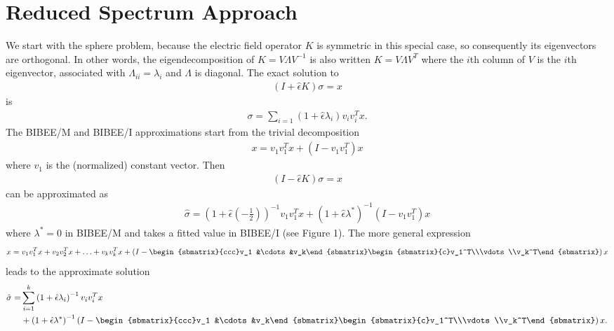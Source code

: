 \section{Reduced Spectrum Approach}
We start with the sphere problem, because the electric field operator
$K$ is symmetric in this special case, so consequently its
eigenvectors are orthogonal.  In other words, the eigendecomposition
of $K = V \Lambda V^{-1}$ is also written $K = V \Lambda V^T$ where
the $i$th column of $V$ is the $i$th eigenvector, associated with
$\Lambda_{ii}= \lambda_i$ and $\Lambda$ is diagonal.  The exact
solution to
\begin{align}
  \left(I + \hat{\epsilon}K\right) \sigma = x
  \end{align}
is
\begin{align}
\sigma = \sum_{i=1} \left(1+\hat{\epsilon}\lambda_i\right) v_i v_i^T x.
  \end{align}
The BIBEE/M and BIBEE/I approximations start from the trivial
decomposition
\begin{align}
  x = v_1 v_1^T x + \left(I - v_1 v_1^T \right) x
  \end{align}
where $v_1$ is the (normalized) constant vector.  Then
\begin{align}
  (I -\hat{\epsilon}K) \sigma = x
\end{align}
can be approximated as
\begin{align}
  \hat{\sigma} = \left(1+\hat{\epsilon}(-\frac{1}{2})\right)^{-1} v_1 v_1^T x
 + \left(1+\hat{\epsilon}\lambda^*\right)^{-1}\left(I- v_1 v_1^T \right) x
  \end{align}
where $\lambda^* = 0$ in BIBEE/M and takes a fitted value in BIBEE/I
(see Figure 1).  The more general expression
\begin{align}
  x = v_1 v_1^T x + v_2 v_2^T x + \ldots + v_k v_k^T x + \left(I-
  \begin{sbmatrix}{ccc}v_1 &\cdots&v_k\end{sbmatrix}
  \begin{sbmatrix}{c}v_1^T\\\vdots\\v_k^T\end{sbmatrix}
  \right)x
  \end{align}
leads to the approximate solution
\begin{align}
  \hat{\sigma} = & \sum_{i=1}^k \left(1+\hat{\epsilon}\lambda_i\right)^{-1} v_i v_i^T x \\
  & + \left(1+\hat{\epsilon}\lambda^*\right)^{-1}\left(I-
  \begin{sbmatrix}{ccc}v_1 &\cdots&v_k\end{sbmatrix}
  \begin{sbmatrix}{c}v_1^T\\\vdots\\v_k^T\end{sbmatrix}
  \right)x.
  \end{align}
